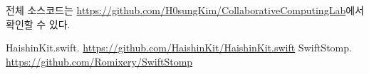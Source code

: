 \documentclass[10pt, a4paper, oneside]{article}
\begin{document}
전체 소스코드는 \href{https://github.com/H0sungKim/CollaborativeComputingLab}{https://github.com/H0sungKim/CollaborativeComputingLab}에서 확인할 수 있다.

\begin{thebibliography}{1}
HaishinKit.swift. \href{https://github.com/HaishinKit/HaishinKit.swift}{https://github.com/HaishinKit/HaishinKit.swift}
SwiftStomp. \href{https://github.com/Romixery/SwiftStomp}{https://github.com/Romixery/SwiftStomp}
\end{thebibliography}
\end{document}
